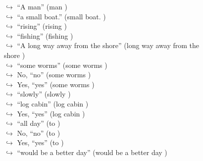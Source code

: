 \documentclass[11pt,a4paper, onecolumn]{article}
\begin{document}
\begin{figure}[t] \small \begin{tcolorbox}[boxsep=0pt,left=5pt,right=0pt,top=2pt,colback = yellow!5] \begin{dialogue}
 \small 
\colorbox{pink!25}{$\hookrightarrow$}
{ ``A man'' (man ) }
\\
\colorbox{pink!25}{$\hookrightarrow$}
{ ``a small boat.'' (small boat. ) }
\\
\colorbox{pink!25}{$\hookrightarrow$}
{ ``rising'' (rising ) }
\\
\colorbox{pink!25}{$\hookrightarrow$}
{ ``fishing'' (fishing ) }
\\
\colorbox{pink!25}{$\hookrightarrow$}
{ ``A long way away from the shore'' (long way away from the shore ) }
\\
\colorbox{pink!25}{$\hookrightarrow$}
{ ``some worms'' (some worms ) }
\\
\colorbox{pink!25}{$\hookrightarrow$}
\colorbox{red!25}{No,}
{ ``no'' (some worms ) }
\\
\colorbox{pink!25}{$\hookrightarrow$}
\colorbox{red!25}{Yes,}
{ ``yes'' (some worms ) }
\\
\colorbox{pink!25}{$\hookrightarrow$}
{ ``slowly'' (slowly ) }
\\
\colorbox{pink!25}{$\hookrightarrow$}
{ ``log cabin'' (log cabin ) }
\\
\colorbox{pink!25}{$\hookrightarrow$}
\colorbox{red!25}{Yes,}
{ ``yes'' (log cabin ) }
\\
\colorbox{pink!25}{$\hookrightarrow$}
{ ``all day'' (to ) }
\\
\colorbox{pink!25}{$\hookrightarrow$}
\colorbox{red!25}{No,}
{ ``no'' (to ) }
\\
\colorbox{pink!25}{$\hookrightarrow$}
\colorbox{red!25}{Yes,}
{ ``yes'' (to ) }
\\
\colorbox{pink!25}{$\hookrightarrow$}
{ ``would be a better day'' (would be a better day ) }
\\
 \end{dialogue}\end{tcolorbox}\end{figure}
\end{document}
